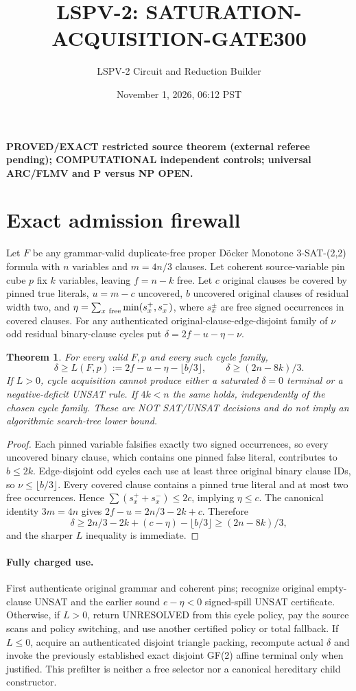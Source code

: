 \documentclass[11pt]{article}
\title{LSPV-2: SATURATION-ACQUISITION-GATE300}
\author{LSPV-2 Circuit and Reduction Builder}
\date{November 1, 2026, 06:12 PST}
\newtheorem{theorem}{Theorem}
\begin{document}
\maketitle
\noindent\textbf{PROVED/EXACT restricted source theorem (external referee pending); COMPUTATIONAL independent controls; universal ARC/FLMV and P versus NP OPEN.}
\section{Exact admission firewall}
Let $F$ be any grammar-valid duplicate-free proper D\"ocker Monotone 3-SAT-(2,2) formula with $n$ variables and $m=4n/3$ clauses. Let coherent source-variable pin cube $p$ fix $k$ variables, leaving $f=n-k$ free. Let $c$ original clauses be covered by pinned true literals, $u=m-c$ uncovered, $b$ uncovered original clauses of residual width two, and $\eta=\sum_{x\ {\rm free}}\min(s_x^+,s_x^-)$, where $s_x^\pm$ are free signed occurrences in covered clauses. For any authenticated original-clause-edge-disjoint family of $\nu$ odd residual binary-clause cycles put $\delta=2f-u-\eta-\nu$.
\begin{theorem}
For every valid $F,p$ and every such cycle family,
\[
\boxed{\delta\ge L(F,p):=2f-u-\eta-\lfloor b/3\rfloor,\qquad
\delta\ge (2n-8k)/3.}
\]
If $L>0$, cycle acquisition cannot produce either a saturated $\delta=0$ terminal or a negative-deficit UNSAT rule. If $4k<n$ the same holds, independently of the chosen cycle family. These are NOT SAT/UNSAT decisions and do not imply an algorithmic search-tree lower bound.
\end{theorem}
\begin{proof}
Each pinned variable falsifies exactly two signed occurrences, so every uncovered binary clause, which contains one pinned false literal, contributes to $b\le2k$. Edge-disjoint odd cycles each use at least three original binary clause IDs, so $\nu\le\lfloor b/3\rfloor$. Every covered clause contains a pinned true literal and at most two free occurrences. Hence $\sum(s_x^++s_x^-)\le2c$, implying $\eta\le c$. The canonical identity $3m=4n$ gives $2f-u=2n/3-2k+c$. Therefore
\[
\delta\ge 2n/3-2k+(c-\eta)-\lfloor b/3\rfloor\ge (2n-8k)/3,
\]
and the sharper $L$ inequality is immediate.
\end{proof}
\paragraph{Fully charged use.}
First authenticate original grammar and coherent pins; recognize original empty-clause UNSAT and the earlier sound $e-\eta<0$ signed-spill UNSAT certificate. Otherwise, if $L>0$, return UNRESOLVED from this cycle policy, pay the source scans and policy switching, and use another certified policy or total fallback. If $L\le0$, acquire an authenticated disjoint triangle packing, recompute actual $\delta$ and invoke the previously established exact disjoint GF(2) affine terminal only when justified. This prefilter is neither a free selector nor a canonical hereditary child constructor.
\end{document}
